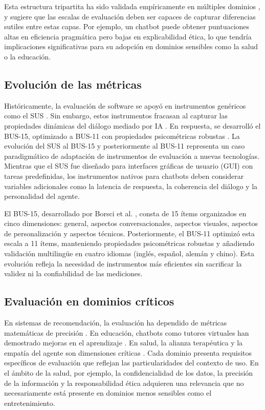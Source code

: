 \documentclass[11pt,twocolumn]{article}
\begin{document}
Esta estructura tripartita ha sido validada empíricamente en múltiples dominios \cite{marconi2026}, y sugiere que las escalas de evaluación deben ser capaces de capturar diferencias sutiles entre estas capas. Por ejemplo, un chatbot puede obtener puntuaciones altas en eficiencia pragmática pero bajas en explicabilidad ética, lo que tendría implicaciones significativas para su adopción en dominios sensibles como la salud o la educación.

\subsection{Evolución de las métricas}

Históricamente, la evaluación de software se apoyó en instrumentos genéricos como el SUS \cite{sus1996}. Sin embargo, estos instrumentos fracasan al capturar las propiedades dinámicas del diálogo mediado por IA \cite{borsci2021}. En respuesta, se desarrolló el BUS-15, optimizado a BUS-11 con propiedades psicométricas robustas \cite{borsci2022}. La evolución del SUS al BUS-15 y posteriormente al BUS-11 representa un caso paradigmático de adaptación de instrumentos de evaluación a nuevas tecnologías. Mientras que el SUS fue diseñado para interfaces gráficas de usuario (GUI) con tareas predefinidas, los instrumentos nativos para chatbots deben considerar variables adicionales como la latencia de respuesta, la coherencia del diálogo y la personalidad del agente.

El BUS-15, desarrollado por Borsci et al. \cite{borsci2021}, consta de 15 ítems organizados en cinco dimensiones: general, aspectos conversacionales, aspectos visuales, aspectos de personalización y aspectos técnicos. Posteriormente, el BUS-11 \cite{borsci2022} optimizó esta escala a 11 ítems, manteniendo propiedades psicométricas robustas y añadiendo validación multilingüe en cuatro idiomas (inglés, español, alemán y chino). Esta evolución refleja la necesidad de instrumentos más eficientes sin sacrificar la validez ni la confiabilidad de las mediciones.

\subsection{Evaluación en dominios críticos}

En sistemas de recomendación, la evaluación ha dependido de métricas matemáticas de precisión \cite{jannach2022}. En educación, chatbots como tutores virtuales han demostrado mejoras en el aprendizaje \cite{kuhail2022, belda2023}. En salud, la alianza terapéutica y la empatía del agente son dimensiones críticas \cite{he2022, fan2023, chung2021}. Cada dominio presenta requisitos específicos de evaluación que reflejan las particularidades del contexto de uso. En el ámbito de la salud, por ejemplo, la confidencialidad de los datos, la precisión de la información y la responsabilidad ética adquieren una relevancia que no necesariamente está presente en dominios menos sensibles como el entretenimiento.
\end{document}
